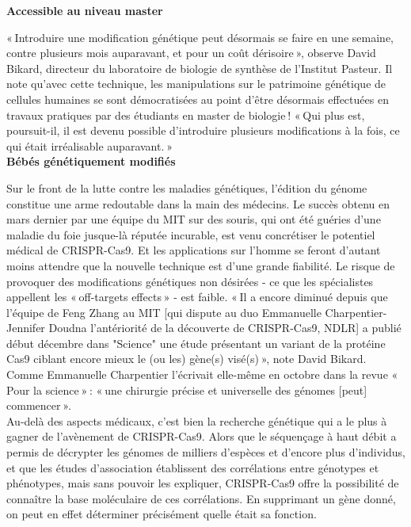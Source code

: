 \documentclass[8pt]{article}
\begin{document}
\textbf{Accessible au niveau master }

« Introduire une modification génétique peut désormais se faire en une semaine, contre plusieurs mois auparavant, et pour un coût dérisoire », observe David Bikard, directeur du laboratoire de biologie de synthèse de l'Institut Pasteur. Il note qu'avec cette technique, les manipulations sur le patrimoine génétique de cellules humaines se sont démocratisées au point d'être désormais effectuées en travaux pratiques par des étudiants en master de biologie ! « Qui plus est, poursuit-il, il est devenu possible d'introduire plusieurs modifications à la fois, ce qui était irréalisable auparavant. »\\

\textbf{Bébés génétiquement modifiés} 

Sur le front de la lutte contre les maladies génétiques, l'édition du génome constitue une arme redoutable dans la main des médecins. Le succès obtenu en mars dernier par une équipe du MIT sur des souris, qui ont été guéries d'une maladie du foie jusque-là réputée incurable, est venu concrétiser le potentiel médical de CRISPR-Cas9. Et les applications sur l'homme se feront d'autant moins attendre que la nouvelle technique est d'une grande fiabilité. Le risque de provoquer des modifications génétiques non désirées - ce que les spécialistes appellent les « off-targets effects » - est faible. « Il a encore diminué depuis que l'équipe de Feng Zhang au MIT [qui dispute au duo Emmanuelle Charpentier-Jennifer Doudna l'antériorité de la découverte de CRISPR-Cas9, NDLR] a publié début décembre dans "Science" une étude présentant un variant de la protéine Cas9 ciblant encore mieux le (ou les) gène(s) visé(s) », note David Bikard. Comme Emmanuelle Charpentier l'écrivait elle-même en octobre dans la revue « Pour la science » : « une chirurgie précise et universelle des génomes [peut] commencer ». \\

Au-delà des aspects médicaux, c'est bien la recherche génétique qui a le plus à gagner de l'avènement de CRISPR-Cas9. Alors que le séquençage à haut débit a permis de décrypter les génomes de milliers d'espèces et d'encore plus d'individus, et que les études d'association établissent des corrélations entre génotypes et phénotypes, mais sans pouvoir les expliquer, CRISPR-Cas9 offre la possibilité de connaître la base moléculaire de ces corrélations. En supprimant un gène donné, on peut en effet déterminer précisément quelle était sa fonction. \\
\end{document}
